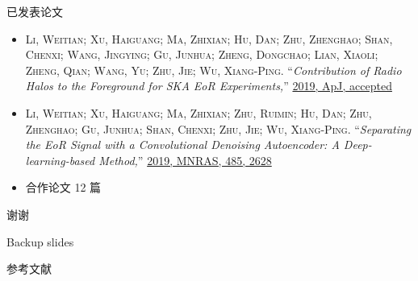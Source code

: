 \documentclass{beamer}
\begin{document}
\begin{frame}{已发表论文}
  \small
  \begin{itemize}
    \item
      \textsc{\alert{Li, Weitian}; Xu, Haiguang; Ma, Zhixian; Hu, Dan;
      Zhu, Zhenghao; Shan, Chenxi; Wang, Jingying; Gu, Junhua;
      Zheng, Dongchao; Lian, Xiaoli; Zheng, Qian; Wang, Yu;
      Zhu, Jie; Wu, Xiang-Ping}.
      \enquote{\it Contribution of Radio Halos to the Foreground for
        SKA EoR Experiments,}
      \href{http://adsabs.harvard.edu/abs/arXiv:1905.05399}{%
        2019, ApJ, accepted}
    \item
      \textsc{\alert{Li, Weitian}; Xu, Haiguang; Ma, Zhixian; Zhu, Ruimin;
      Hu, Dan; Zhu, Zhenghao; Gu, Junhua; Shan, Chenxi; Zhu, Jie;
      Wu, Xiang-Ping}.
      \enquote{\it Separating the EoR Signal with a Convolutional Denoising
        Autoencoder: A Deep-learning-based Method,}
      \href{http://adsabs.harvard.edu/abs/2019MNRAS.485.2628L}{%
        2019, MNRAS, 485, 2628}
    \item
      合作论文 12 篇
  \end{itemize}
\end{frame}

\begin{frame}[standout]
  \Huge 谢\cspace{}谢

\end{frame}


\appendix

\begin{frame}[standout]
  Backup slides
\end{frame}

\begin{frame}[allowframebreaks]{参考文献}
  \printbibliography[heading=none]
\end{frame}
\end{document}
